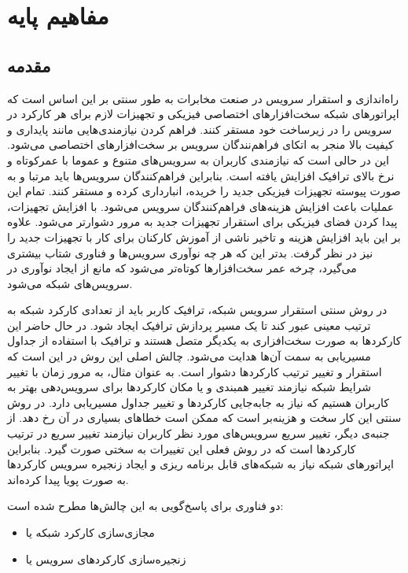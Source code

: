 \chapter{مفاهیم پایه}

\section{مقدمه}

راه‌اندازی و استقرار سرویس در صنعت مخابرات به طور سنتی بر این اساس است که اپراتورهای شبکه سخت‌افزارهای اختصاصی فیزیکی و تجهیزات لازم برای هر کارکرد در سرویس را در زیرساخت خود مستقر کنند.
فراهم کردن نیازمندی‌هایی مانند پایداری و کیفیت بالا منجر به اتکای فراهم‌نندگان سرویس بر سخت‌افزارهای اختصاصی می‌شود. 
این در حالی است که نیازمندی کاربران به سرویس‌های متنوع و عموما با عمرکوتاه و نرخ بالای ترافیک افزایش یافته است.
بنابراین فراهم‌کنندگان سرویس‌ها باید مرتبا و به صورت پیوسته تجهیزات فیزیکی جدید را خریده، انبارداری کرده و مستقر کنند.
تمام این عملیات باعث افزایش هزینه‌های فراهم‌کنندگان سرویس می‌شود.
با افزایش تجهیزات، پیدا کردن فضای فیزیکی برای استقرار تجهیزات جدید به مرور دشوارتر می‌شود.
علاوه بر این باید افزایش هزینه و تاخیر ناشی از آموزش کارکنان برای کار با تجهیزات جدید را نیز در نظر گرفت.
بدتر این که هر چه نوآوری سرویس‌ها و فناوری شتاب بیشتری می‌گیرد، چرخه عمر سخت‌افزارها کوتاه‌تر می‌شود که مانع از ایجاد نوآوری در سرویس‌های شبکه می‌شود.

در روش سنتی استقرار سرویس شبکه، ترافیک کاربر باید از تعدادی کارکرد شبکه به ترتیب معینی عبور کند تا یک مسیر پردازش ترافیک ایجاد شود.
در حال حاضر این کارکردها به صورت سخت‌افزاری به یکدیگر متصل هستند و ترافیک با استفاده از جداول مسیریابی به سمت آن‌ها هدایت می‌شود.
چالش اصلی این روش در این است که استقرار و تغییر ترتیب کارکردها دشوار است.
به عنوان مثال، به مرور زمان با تغییر شرایط شبکه نیازمند تغییر همبندی و یا مکان کارکردها برای سرویس‌دهی بهتر به کاربران هستیم که نیاز به جا‌به‌جایی کارکردها و تغییر جداول مسیریابی دارد.
در روش سنتی این کار سخت و هزینه‌بر است که ممکن است خطاهای بسیاری در آن رخ دهد.
از جنبه‌ی دیگر، تغییر سریع سرویس‌های مورد نظر کاربران نیازمند تغییر سریع در ترتیب کارکردها است که در روش فعلی این تغییرات به سختی صورت گیرد.
بنابراین اپراتورهای شبکه نیاز به شبکه‌های قابل برنامه ریزی و ایجاد زنجیره سرویس کارکردها به صورت پویا پیدا کرده‌اند.

دو فناوری برای پاسخ‌گویی به این چالش‌ها مطرح شده است:

\begin{itemize}
    \item مجازی‌سازی کارکرد شبکه یا 
    \item زنجیره‌سازی کارکردهای سرویس یا 
\end{itemize}

